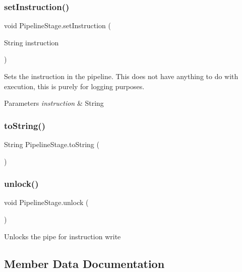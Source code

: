 \subsubsection{\texorpdfstring{set\+Instruction()}{setInstruction()}}
{\footnotesize\ttfamily void Pipeline\+Stage.\+set\+Instruction (\begin{DoxyParamCaption}\item[{String}]{instruction }\end{DoxyParamCaption})\hspace{0.3cm}{\ttfamily [package]}}

Sets the instruction in the pipeline. This does not have anything to do with execution, this is purely for logging purposes. 
\begin{DoxyParams}{Parameters}
{\em instruction} & String \\
\hline
\end{DoxyParams}
\mbox{\label{class_pipeline_stage_afe1a4701506f8257e53caff512af905d}} 
\subsubsection{\texorpdfstring{to\+String()}{toString()}}
{\footnotesize\ttfamily String Pipeline\+Stage.\+to\+String (\begin{DoxyParamCaption}{ }\end{DoxyParamCaption})}

\mbox{\label{class_pipeline_stage_ade83daea8199744f2f6466f5cbd87330}} 
\subsubsection{\texorpdfstring{unlock()}{unlock()}}
{\footnotesize\ttfamily void Pipeline\+Stage.\+unlock (\begin{DoxyParamCaption}{ }\end{DoxyParamCaption})\hspace{0.3cm}{\ttfamily [package]}}

Unlocks the pipe for instruction write 

\subsection{Member Data Documentation}
\mbox{\label{class_pipeline_stage_abf7e2ce98acaa474f4be90e14fda0f26}} 
